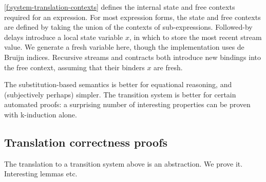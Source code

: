 



\autoref{f:system-translation-contexts} defines the internal state and free contexts required for an expression.
For most expression forms, the state and free contexts are defined by taking the union of the contexts of sub-expressions.
Followed-by delays introduce a local state variable $x$, in which to store the most recent stream value.
We generate a fresh variable here, though the implementation uses de Bruijn indices.
Recursive streams and contracts both introduce new bindings into the free context, assuming that their binders $x$ are fresh.

The substitution-based semantics is better for equational reasoning, and (subjectively perhaps) simpler.
The transition system is better for certain automated proofs: a surprising number of interesting properties can be proven with k-induction alone.

\subsection{Translation correctness proofs}
\label{s:transition:proof}

The translation to a transition system above is an abstraction.
We prove it.
Interesting lemmas etc.

